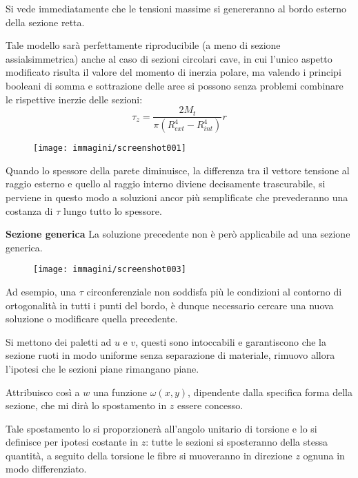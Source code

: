 \documentclass{article}
\begin{document}
\begin{adjustwidth}{2in}{}
			Si vede immediatamente che le tensioni massime si genereranno al bordo esterno della sezione retta.\newline 
			
			Tale modello sarà perfettamente riproducibile (a meno di sezione assialsimmetrica) anche al caso di sezioni circolari cave, in cui l’unico aspetto
			modificato risulta il valore del momento di inerzia polare, ma valendo i principi booleani di somma e sottrazione delle aree si possono senza problemi combinare le rispettive inerzie delle sezioni: 
			\[ \boxed{\tau_z = \dfrac{2M_t}{\pi (R_{ext}^4-R_{int}^4)}r} \]
			
\begin{figure}[H]
	\centering
	\texttt{[image: immagini/screenshot001]}
	\label{fig:screenshot001}
\end{figure}


			Quando lo spessore della parete diminuisce, la differenza tra il vettore tensione al raggio esterno e quello al raggio interno diviene decisamente trascurabile, si perviene in questo modo a soluzioni ancor più semplificate che prevederanno una costanza di $\tau$ lungo tutto lo spessore. \newline

		\textbf{{\Large Sezione generica}} \newline 
		La soluzione precedente non è però applicabile ad una sezione generica. 
\begin{figure}[H]
	\centering
	\label{fig:screenshot003}
	\texttt{[image: immagini/screenshot003]}
\end{figure}
		Ad esempio, una $\tau$ circonferenziale non soddisfa più le condizioni al contorno di ortogonalità in tutti i punti del bordo, è dunque necessario cercare una nuova soluzione o modificare quella precedente.
		
		Si mettono dei paletti ad $u$ e $v$, questi sono intoccabili e garantiscono che la sezione ruoti in modo uniforme senza separazione di materiale, rimuovo allora l'ipotesi che le sezioni piane rimangano piane. 
		
		Attribuisco così a $w$ una funzione $\omega(x,y)$, dipendente dalla specifica forma della sezione, che mi dirà lo spostamento in $z$ essere concesso. 
		
		Tale spostamento lo si proporzionerà all'angolo unitario di torsione e lo si definisce per ipotesi costante in $z$: tutte le sezioni si sposteranno della stessa quantità, a seguito della torsione le fibre si muoveranno in direzione $z$ ognuna in modo differenziato.
		

\end{adjustwidth}
\end{document}
